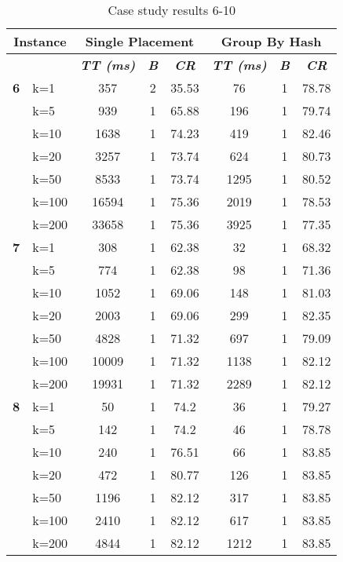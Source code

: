     \begin{table}[htbp]
    \caption{Case study results 6-10}
    \centering
    \begin{tabular}{|l|l|c|c|c|c|c|c|}
    \hline
    \multicolumn{ 2}{|c|}{\textbf{Instance}} & \multicolumn{ 3}{c|}{\textbf{Single Placement}} & \multicolumn{ 3}{c|}{\textbf{Group By Hash}} \\ \hline
    \multicolumn{ 2}{|l|}{} & \textbf{\textit{TT (ms)}} & \textbf{\textit{B}} & \textbf{\textit{CR}} & \textbf{\textit{TT (ms)}} & \textbf{\textit{B}} & \textbf{\textit{CR}} \\ \hline
    \multicolumn{1}{|r|}{\textbf{6}} & k=1 & 357 & 2 & 35.53 & 76 & 1 & 78.78 \\ 
     & k=5 & 939 & 1 & 65.88 & 196 & 1 & 79.74 \\ 
     & k=10 & 1638 & 1 & 74.23 & 419 & 1 & 82.46 \\ 
     & k=20 & 3257 & 1 & 73.74 & 624 & 1 & 80.73 \\ 
     & k=50 & 8533 & 1 & 73.74 & 1295 & 1 & 80.52 \\ 
     & k=100 & 16594 & 1 & 75.36 & 2019 & 1 & 78.53 \\ 
     & k=200 & 33658 & 1 & 75.36 & 3925 & 1 & 77.35 \\ \hline
    \multicolumn{1}{|r|}{\textbf{7}} & k=1 & 308 & 1 & 62.38 & 32 & 1 & 68.32 \\ 
     & k=5 & 774 & 1 & 62.38 & 98 & 1 & 71.36 \\ 
     & k=10 & 1052 & 1 & 69.06 & 148 & 1 & 81.03 \\ 
     & k=20 & 2003 & 1 & 69.06 & 299 & 1 & 82.35 \\ 
     & k=50 & 4828 & 1 & 71.32 & 697 & 1 & 79.09 \\ 
     & k=100 & 10009 & 1 & 71.32 & 1138 & 1 & 82.12 \\ 
     & k=200 & 19931 & 1 & 71.32 & 2289 & 1 & 82.12 \\ \hline
    \multicolumn{1}{|r|}{\textbf{8}} & k=1 & 50 & 1 & 74.2 & 36 & 1 & 79.27 \\ 
     & k=5 & 142 & 1 & 74.2 & 46 & 1 & 78.78 \\ 
     & k=10 & 240 & 1 & 76.51 & 66 & 1 & 83.85 \\ 
     & k=20 & 472 & 1 & 80.77 & 126 & 1 & 83.85 \\ 
     & k=50 & 1196 & 1 & 82.12 & 317 & 1 & 83.85 \\ 
     & k=100 & 2410 & 1 & 82.12 & 617 & 1 & 83.85 \\ 
     & k=200 & 4844 & 1 & 82.12 & 1212 & 1 & 83.85 \\ \hline

\end{tabular}
\end{table}
